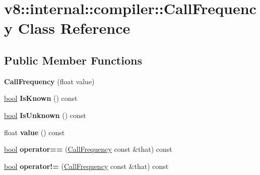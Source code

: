 \hypertarget{classv8_1_1internal_1_1compiler_1_1CallFrequency}{}\section{v8\+:\+:internal\+:\+:compiler\+:\+:Call\+Frequency Class Reference}
\label{classv8_1_1internal_1_1compiler_1_1CallFrequency}
\subsection*{Public Member Functions}
\begin{DoxyCompactItemize}
\item 
\mbox{\label{classv8_1_1internal_1_1compiler_1_1CallFrequency_acb87aec225693523584dc223738cfb44}} 
{\bfseries Call\+Frequency} (float value)
\item 
\mbox{\label{classv8_1_1internal_1_1compiler_1_1CallFrequency_abf1d673bf17749af99afb7649e1e8826}} 
\mbox{\hyperlink{classbool}{bool}} {\bfseries Is\+Known} () const
\item 
\mbox{\label{classv8_1_1internal_1_1compiler_1_1CallFrequency_aace4f795eec0071dd37afcdd76736722}} 
\mbox{\hyperlink{classbool}{bool}} {\bfseries Is\+Unknown} () const
\item 
\mbox{\label{classv8_1_1internal_1_1compiler_1_1CallFrequency_aa3966bd2be3fa537b3f7a7bd878038a1}} 
float {\bfseries value} () const
\item 
\mbox{\label{classv8_1_1internal_1_1compiler_1_1CallFrequency_a82e8306b07b5c96308870341dc9b7c0f}} 
\mbox{\hyperlink{classbool}{bool}} {\bfseries operator==} (\mbox{\hyperlink{classv8_1_1internal_1_1compiler_1_1CallFrequency}{Call\+Frequency}} const \&that) const
\item 
\mbox{\label{classv8_1_1internal_1_1compiler_1_1CallFrequency_a51a3d70cd07497722272566f6d1c28d9}} 
\mbox{\hyperlink{classbool}{bool}} {\bfseries operator!=} (\mbox{\hyperlink{classv8_1_1internal_1_1compiler_1_1CallFrequency}{Call\+Frequency}} const \&that) const
\end{DoxyCompactItemize}
